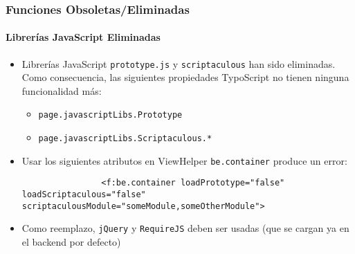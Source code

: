 \begin{frame}[fragile]
	\frametitle{Funciones Obsoletas/Eliminadas}
	\framesubtitle{Librerías JavaScript Eliminadas}

	\begin{itemize}

		\item Librerías JavaScript \texttt{prototype.js} y \texttt{scriptaculous} han sido eliminadas.
			Como consecuencia, las siguientes propiedades TypoScript no tienen ninguna funcionalidad más:

			\begin{itemize}
				\item \texttt{page.javascriptLibs.Prototype}
				\item \texttt{page.javascriptLibs.Scriptaculous.*}
			\end{itemize}

		\item Usar los siguientes atributos en ViewHelper \texttt{be.container} produce un error:
			\begin{lstlisting}
				<f:be.container loadPrototype="false" loadScriptaculous="false" scriptaculousModule="someModule,someOtherModule">
			\end{lstlisting}

		\item Como reemplazo, \texttt{jQuery} y \texttt{RequireJS} deben ser usadas\newline
			(que se cargan ya en el backend por defecto)

	\end{itemize}

\end{frame}


